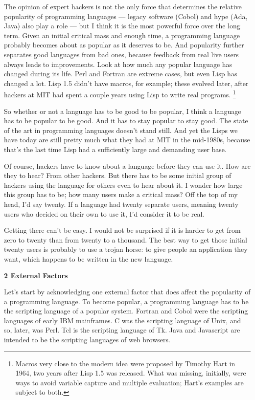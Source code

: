 The opinion of expert hackers is not the only force that determines the
relative popularity of programming languages --- legacy software (Cobol)
and hype (Ada, Java) also play a role --- but I think it is the most
powerful force over the long term. Given an initial critical mass and
enough time, a programming language probably becomes about as popular as
it deserves to be. And popularity further separates good languages from
bad ones, because feedback from real live users always leads to
improvements. Look at how much any popular language has changed during
its life. Perl and Fortran are extreme cases, but even Lisp has changed
a lot. Lisp 1.5 didn't have macros, for example; these evolved later,
after hackers at MIT had spent a couple years using Lisp to write real
programs. \footnote{Macros very close to the modern idea were proposed by Timothy
Hart in 1964, two years after Lisp 1.5 was released. What was missing,
initially, were ways to avoid variable capture and multiple evaluation;
Hart's examples are subject to both.}

So whether or not a language has to be good to be popular, I think a
language has to be popular to be good. And it has to stay popular to
stay good. The state of the art in programming languages doesn't stand
still. And yet the Lisps we have today are still pretty much what they
had at MIT in the mid-1980s, because that's the last time Lisp had a
sufficiently large and demanding user base.

Of course, hackers have to know about a language before they can use it.
How are they to hear? From other hackers. But there has to be some
initial group of hackers using the language for others even to hear
about it. I wonder how large this group has to be; how many users make a
critical mass? Off the top of my head, I'd say twenty. If a language had
twenty separate users, meaning twenty users who decided on their own to
use it, I'd consider it to be real.

Getting there can't be easy. I would not be surprised if it is harder to
get from zero to twenty than from twenty to a thousand. The best way to
get those initial twenty users is probably to use a trojan horse: to
give people an application they want, which happens to be written in the
new language.

\textbf{2 External Factors}

Let's start by acknowledging one external factor that does affect the
popularity of a programming language. To become popular, a programming
language has to be the scripting language of a popular system. Fortran
and Cobol were the scripting languages of early IBM mainframes. C was
the scripting language of Unix, and so, later, was Perl. Tcl is the
scripting language of Tk. Java and Javascript are intended to be the
scripting languages of web browsers.


